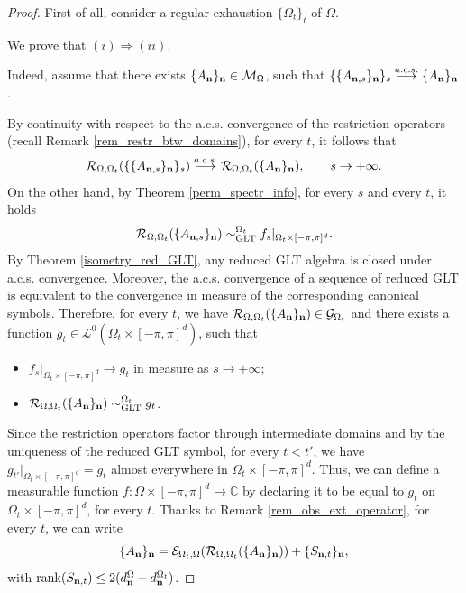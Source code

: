 \documentclass[10pt,a4paper]{amsart}
\begin{document}
\begin{proof}First of all, consider a regular exhaustion $\{\Omega_t\}_t$ of $\Omega$.

     We prove that $(i)\Rightarrow(ii)$. 
    
    Indeed, assume that there exists $\{A_\mathbf n\}_\mathbf n\in\mathcal{M}_\Omega$, such that $\{\{A_{\mathbf n,s}\}_\mathbf n\}_s\overset{a.c.s.}{\longrightarrow}\{A_\mathbf n\}_\mathbf n$.

    By continuity with respect to the a.c.s. convergence of the restriction operators (recall Remark \ref{rem_restr_btw_domains}), for every $t$, it follows that
    \begin{equation*}
        \mathcal{R}_{\Omega,\Omega_t}(\{\{A_{\mathbf n,s}\}_\mathbf n\}_s)\overset{a.c.s.}{\longrightarrow}\mathcal{R}_{\Omega,\Omega_t}(\{A_\mathbf n\}_\mathbf n),\qquad s\to+\infty.
    \end{equation*}
    On the other hand, by Theorem \ref{perm_spectr_info}, for every $s$ and every $t$, it holds 
    \begin{equation*}
        \mathcal{R}_{\Omega,\Omega_t}(\{A_{\mathbf n,s}\}_\mathbf n)\sim_{\mathrm{GLT}}^{\Omega_t}f_s|_{\Omega_t\times[-\pi,\pi]^d}.
    \end{equation*}
    By Theorem \ref{isometry_red_GLT}, any reduced GLT algebra is closed under a.c.s. convergence. Moreover, the a.c.s. convergence of a sequence of reduced GLT is equivalent to the convergence in measure of the corresponding canonical symbols. Therefore, for every $t$, we have $\mathcal{R}_{\Omega,\Omega_t}(\{A_\mathbf n\}_\mathbf n)\in\mathcal{G}_{\Omega_t}$ and there exists a function $g_t\in\mathcal{L}^0(\Omega_t\times[-\pi,\pi]^d)$, such that
    \begin{itemize}
        \item $f_s|_{\Omega_t\times[-\pi,\pi]^d}\to g_t$ in measure as $s\to +\infty$;
        \item $\mathcal{R}_{\Omega,\Omega_t}(\{A_\mathbf n\}_\mathbf n)\sim_{\mathrm{GLT}}^{\Omega_t}g_t$.
    \end{itemize}
    Since the restriction operators factor through intermediate domains and by the uniqueness of the reduced GLT symbol, for every $t<t'$, we have $g_{t'}|_{\Omega_{t}\times[-\pi,\pi]^d}=g_t$ almost everywhere in $\Omega_t\times[-\pi,\pi]^d$. Thus, we can define a measurable function $f:\Omega\times[-\pi,\pi]^d\to\mathbb{C}$ by declaring it to be equal to $g_t$ on $\Omega_t\times[-\pi,\pi]^d$, for every $t$. 
    Thanks to Remark \ref{rem_obs_ext_operator}, for every $t$, we can write 
    \begin{equation*}
        \{A_{\mathbf n}\}_\mathbf n=\mathcal{E}_{\Omega_t,\Omega}(\mathcal{R}_{\Omega,\Omega_t}(\{A_{\mathbf n}\}_\mathbf n))+\{S_{\mathbf n,t}\}_\mathbf n,
    \end{equation*}
    with $\mathrm{rank}(S_{\mathbf n,t})\leq 2(d_{\mathbf n}^{\Omega}-d_\mathbf n^{\Omega_t})$.
    

\end{proof}
\end{document}
